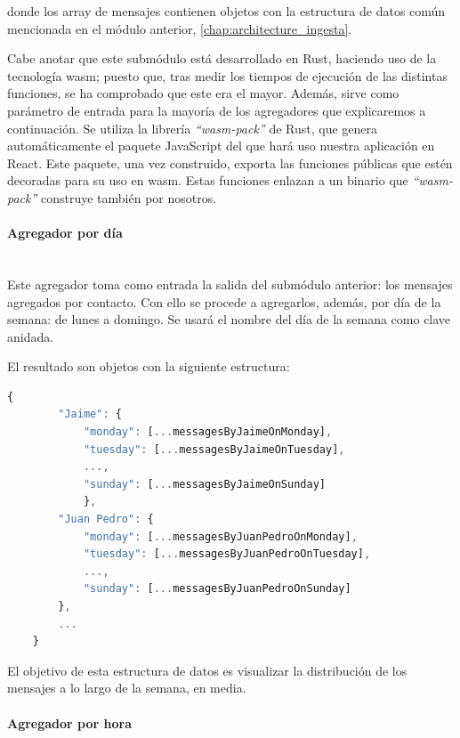 donde los array de mensajes contienen objetos con la estructura de datos común mencionada en el módulo anterior,  \autoref{chap:architecture_ingesta}.

Cabe anotar que este submódulo está desarrollado en Rust, haciendo uso de la tecnología \acrfull{wasm}; puesto que, tras medir los tiempos de ejecución de las distintas funciones, se ha comprobado que este era el mayor. Además, sirve como parámetro de entrada para la mayoría de los agregadores que explicaremos a continuación. Se utiliza la librería \textit{``wasm-pack''} de Rust, que genera automáticamente el paquete JavaScript del que hará uso nuestra aplicación en React. Este paquete, una vez construido, exporta las funciones públicas que estén decoradas para su uso en \acrshort{wasm}. Estas funciones enlazan a un binario que \textit{``wasm-pack''} construye también por nosotros.

\paragraph{Agregador por día}\mbox{}\\

Este agregador toma como entrada la salida del submódulo anterior: los mensajes agregados por contacto. Con ello se procede a agregarlos, además, por día de la semana: de lunes a domingo. Se usará el nombre del día de la semana como clave anidada.

El resultado son objetos con la siguiente estructura:

\begin{lstlisting}[language=JavaScript]
	{
		"Jaime": {
			"monday": [...messagesByJaimeOnMonday],
			"tuesday": [...messagesByJaimeOnTuesday],
			...,
			"sunday": [...messagesByJaimeOnSunday]
			},
		"Juan Pedro": {
			"monday": [...messagesByJuanPedroOnMonday],
			"tuesday": [...messagesByJuanPedroOnTuesday],
			...,
			"sunday": [...messagesByJuanPedroOnSunday]
		},
		...
	}
\end{lstlisting}

El objetivo de esta estructura de datos es visualizar la distribución de los mensajes a lo largo de la semana, en media.

\paragraph{Agregador por hora}\mbox{}\\

